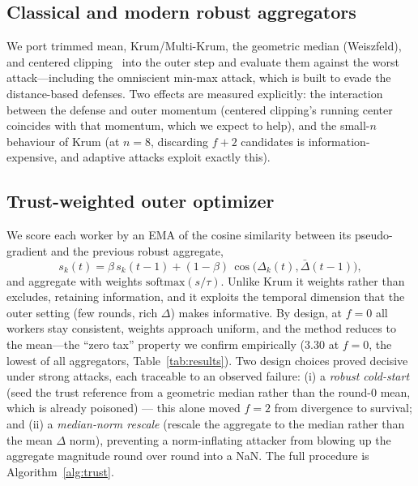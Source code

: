 \documentclass[11pt]{article}
\newcommand{\dg}{\Delta}          %
\newcommand{\agg}{\bar{\Delta}}   %
\begin{document}
\subsection{Classical and modern robust aggregators}
We port trimmed mean, Krum/Multi-Krum, the geometric median (Weiszfeld), and centered
clipping~\citep{centeredclipping2021} into the outer step and evaluate them against the worst
attack---including the omniscient min-max attack, which is built to evade the distance-based
defenses. Two effects are measured explicitly: the interaction between the defense and outer
momentum (centered clipping's running center coincides with that momentum, which we expect to
help), and the small-$n$ behaviour of Krum (at $n=8$, discarding $f{+}2$ candidates is
information-expensive, and adaptive attacks exploit exactly this).

\subsection{Trust-weighted outer optimizer}
We score each worker by an EMA of the cosine similarity between its pseudo-gradient and the
previous robust aggregate,
\begin{equation}
  s_k(t) = \beta\, s_k(t{-}1) + (1-\beta)\,\cos\!\big(\dg_k(t), \agg(t{-}1)\big),
\end{equation}
and aggregate with weights $\mathrm{softmax}(s/\tau)$. Unlike Krum it weights rather than
excludes, retaining information, and it exploits the temporal dimension that the outer setting
(few rounds, rich $\dg$) makes informative. By design, at $f=0$ all workers stay consistent,
weights approach uniform, and the method reduces to the mean---the ``zero tax'' property we
confirm empirically ($3.30$ at $f{=}0$, the lowest of all aggregators, Table~\ref{tab:results}).
Two design choices proved decisive under strong attacks, each traceable to an observed failure:
(i) a \emph{robust cold-start} (seed the trust reference from a geometric median rather than
the round-0 mean, which is already poisoned) --- this alone moved $f{=}2$ from divergence to
survival; and (ii) a \emph{median-norm rescale} (rescale the aggregate to the median rather
than the mean $\Delta$ norm), preventing a norm-inflating attacker from blowing up the
aggregate magnitude round over round into a NaN. The full procedure is
Algorithm~\ref{alg:trust}.
\end{document}
